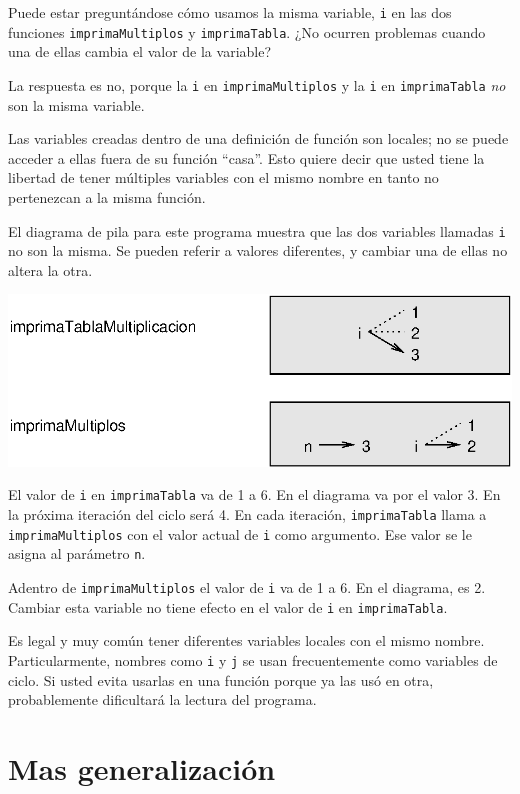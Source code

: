 Puede estar preguntándose cómo usamos la misma variable, \texttt{i} en 
las dos funciones \texttt{imprimaMultiplos} y \texttt{imprimaTabla}. ¿No 
ocurren problemas cuando una de ellas cambia el valor de la variable?

La respuesta es no, porque la  \texttt{i} en \texttt{imprimaMultiplos} y la
\texttt{i} en \texttt{imprimaTabla} {\em no} son la misma variable.

Las variables creadas dentro de una definición de función son locales; no
se puede acceder a ellas fuera de su función  ``casa''.  Esto quiere
decir que usted tiene la libertad de tener múltiples variables con 
el mismo nombre en tanto no pertenezcan a la misma función.

El diagrama de pila para este programa muestra que las dos
variables llamadas \texttt{i} no son la misma.  Se pueden referir a
valores diferentes, y cambiar una de ellas no altera la otra.

\beforefig
\centerline{\includegraphics{illustrations/stack4.eps}}
\afterfig

El valor de \texttt{i} en \texttt{imprimaTabla} va de 1 a 6.  
En el diagrama va por el valor 3.  En la próxima iteración del ciclo será 4.  
En cada iteración, \texttt{imprimaTabla} llama a 
\texttt{imprimaMultiplos} con el valor actual de  \texttt{i} como
argumento.  Ese valor se le asigna al parámetro \texttt{n}.

Adentro de  \texttt{imprimaMultiplos} el valor de \texttt{i} va de
1 a 6.  En el diagrama, es 2.  Cambiar esta variable
no tiene efecto en el valor de  \texttt{i} en \texttt{imprimaTabla}.

Es legal y muy común tener diferentes variables locales con el mismo
nombre. Particularmente, nombres como  \texttt{i} y \texttt{j} se usan
frecuentemente como variables de ciclo. Si usted evita
usarlas en una función porque ya las usó en otra, probablemente
dificultará la lectura del programa.


\section{Mas generalización}

